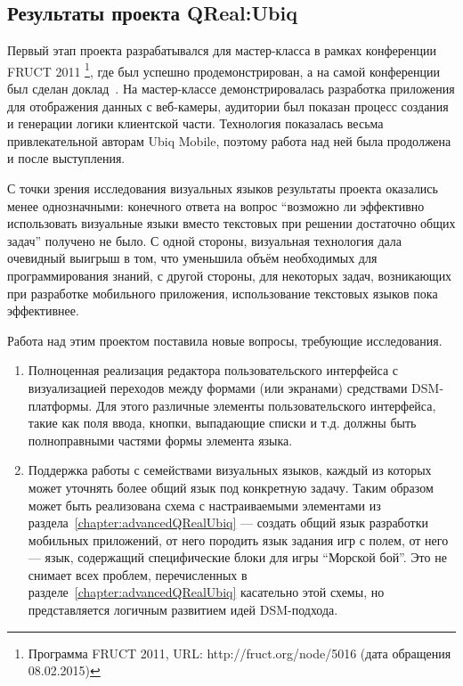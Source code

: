 \subsection{Результаты проекта QReal:Ubiq}
Первый этап проекта разрабатывался для мастер-класса в рамках конференции FRUCT 2011%
\footnote{Программа FRUCT 2011, URL: http://fruct.org/node/5016 (дата обращения 08.02.2015)}, 
где был успешно продемонстрирован, а на самой конференции был сделан доклад~\cite{bryksin2011ubiq}. 
На мастер-классе демонстрировалась разработка приложения для отображения данных 
с веб-камеры, аудитории был показан процесс создания и генерации логики клиентской 
части. Технология показалась весьма привлекательной авторам Ubiq Mobile, поэтому работа 
над ней была продолжена и после выступления.

С точки зрения исследования визуальных языков результаты проекта оказались менее однозначными: 
конечного ответа на вопрос "`возможно ли эффективно использовать визуальные языки 
вместо текстовых при решении достаточно общих задач"' получено не было. С одной стороны, 
визуальная технология дала очевидный выигрыш в том, что уменьшила объём необходимых 
для программирования знаний, с другой стороны, для некоторых задач, возникающих при 
разработке мобильного приложения, использование текстовых языков пока эффективнее. 

Работа над этим проектом поставила новые вопросы, требующие исследования. 
\begin{enumerate}
	\item Полноценная реализация редактора пользовательского интерфейса с визуализацией 
		переходов между формами (или экранами) средствами \ac{DSM}-платформы. Для этого различные 
		элементы пользовательского интерфейса, такие как поля ввода, кнопки, выпадающие 
		списки и т.д. должны быть полноправными частями формы элемента языка.
	\item Поддержка работы с семействами визуальных языков, каждый из которых может 
		уточнять более общий язык под конкретную задачу. Таким образом может быть реализована 
		схема с настраиваемыми элементами из раздела~\ref{chapter:advancedQRealUbiq} --- 
		создать общий язык разработки мобильных приложений, от него породить язык задания 
		игр с полем, от него --- язык, содержащий специфические блоки для игры "`Морской бой"'. 
		Это не снимает всех проблем, перечисленных в разделе~\ref{chapter:advancedQRealUbiq} 
		касательно этой схемы, но представляется логичным развитием идей \ac{DSM}-подхода.
\end{enumerate}